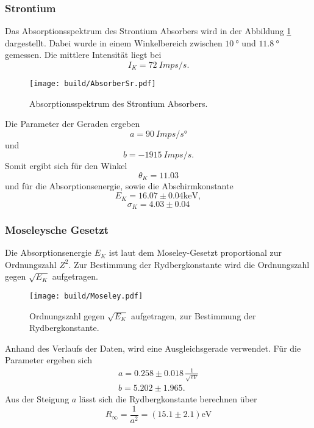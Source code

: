 \subsubsection{Strontium}
Das Absorptionsspektrum des Strontium Absorbers wird in der Abbildung \ref{fig:AbSr} dargestellt.
Dabei wurde in einem Winkelbereich zwischen $\qty{10}{°}$ und $\qty{11.8}{°}$ gemessen.
Die mittlere Intensität liegt bei 
\begin{equation*}
    I_K = \qty{72}{Imps/s}.
\end{equation*}
\begin{figure}[H]
    \centering
    \texttt{[image: build/AbsorberSr.pdf]}    
    \caption{Absorptionsspektrum des Strontium Absorbers.}
    \label{fig:AbSr}
\end{figure}
Die Parameter der Geraden ergeben 
\begin{equation*}
    a = \qty{90}{Imps/s°}
\end{equation*}
und
\begin{equation*}
    b = \qty{-1915}{Imps/s}.
\end{equation*}
Somit ergibt sich für den Winkel
\begin{equation*}
    \theta_K = 11.03
\end{equation*}
und für die Absorptionsenergie, sowie die Abschirmkonstante
\begin{equation*}
   E_K = 16.07 \pm 0.04 \unit{\kilo\electronvolt}, 
\end{equation*}
\begin{equation*}
    \sigma_K = 4.03 \pm 0.04
\end{equation*}

\subsubsection{Moseleysche Gesetzt}
Die Absorptionsenergie $E_K$ ist laut dem Moseley-Gesetzt proportional zur Ordnungszahl $Z^2$.
Zur Bestimmung der Rydbergkonstante wird die Ordnungszahl gegen $\sqrt{E_K}$ aufgetragen.

\begin{figure}[H]
    \centering
    \texttt{[image: build/Moseley.pdf]}
    \caption{Ordnungszahl gegen $\sqrt{E_K}$ aufgetragen, zur Bestimmung der Rydbergkonstante.}
    \label{fig:Mos}
\end{figure}
\noindent Anhand des Verlaufs der Daten, wird eine Ausgleichsgerade verwendet.
Für die Parameter ergeben sich 
\begin{align*}
    a = 0.258 \pm 0.018 \, \frac{1}{\sqrt{eV}} \\
    b = 5.202 \pm 1.965.
\end{align*} 
Aus der Steigung $a$ lässt sich die Rydbergkonstante berechnen über
\begin{equation*}
    R_\infty = \frac{1}{a^2} = (15.1 \pm 2.1) \unit{\electronvolt}
\end{equation*}